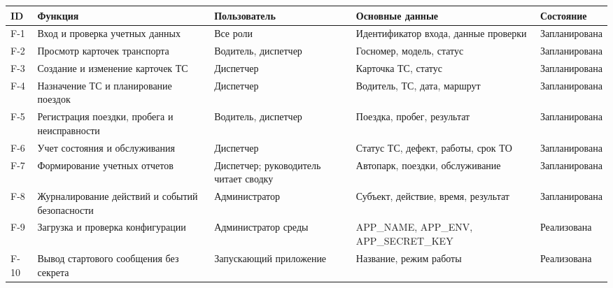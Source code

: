 \documentclass[12pt,a4paper]{article}
\begin{document}
\small
\begin{longtable}{p{0.8cm}p{3.6cm}p{2.7cm}p{4cm}p{3cm}}
\toprule ID & Функция & Пользователь & Основные данные & Состояние \\
\midrule\endhead
F-1 & Вход и проверка учетных данных & Все роли & Идентификатор входа, данные проверки & Запланирована \\
F-2 & Просмотр карточек транспорта & Водитель, диспетчер & Госномер, модель, статус & Запланирована \\
F-3 & Создание и изменение карточек ТС & Диспетчер & Карточка ТС, статус & Запланирована \\
F-4 & Назначение ТС и планирование поездок & Диспетчер & Водитель, ТС, дата, маршрут & Запланирована \\
F-5 & Регистрация поездки, пробега и неисправности & Водитель, диспетчер & Поездка, пробег, результат & Запланирована \\
F-6 & Учет состояния и обслуживания & Диспетчер & Статус ТС, дефект, работы, срок ТО & Запланирована \\
F-7 & Формирование учетных отчетов & Диспетчер; руководитель читает сводку & Автопарк, поездки, обслуживание & Запланирована \\
F-8 & Журналирование действий и событий безопасности & Администратор & Субъект, действие, время, результат & Запланирована \\
F-9 & Загрузка и проверка конфигурации & Администратор среды & APP\_NAME, APP\_ENV, APP\_SECRET\_KEY & Реализована \\
F-10 & Вывод стартового сообщения без секрета & Запускающий приложение & Название, режим работы & Реализована \\
\bottomrule
\end{longtable}
\normalsize
\end{document}
